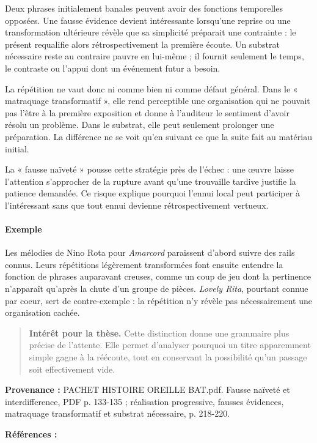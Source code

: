 \documentclass[10pt,a4paper]{article}
\begin{document}
Deux phrases initialement banales peuvent avoir des fonctions temporelles opposées. Une fausse évidence devient intéressante lorsqu'une reprise ou une transformation ultérieure révèle que sa simplicité préparait une contrainte : le présent requalifie alors rétrospectivement la première écoute. Un substrat nécessaire reste au contraire pauvre en lui-même ; il fournit seulement le temps, le contraste ou l'appui dont un événement futur a besoin.

La répétition ne vaut donc ni comme bien ni comme défaut général. Dans le « matraquage transformatif », elle rend perceptible une organisation qui ne pouvait pas l'être à la première exposition et donne à l'auditeur le sentiment d'avoir résolu un problème. Dans le substrat, elle peut seulement prolonger une préparation. La différence ne se voit qu'en suivant ce que la suite fait au matériau initial.

La « fausse naïveté » pousse cette stratégie près de l'échec : une œuvre laisse l'attention s'approcher de la rupture avant qu'une trouvaille tardive justifie la patience demandée. Ce risque explique pourquoi l'ennui local peut participer à l'intéressant sans que tout ennui devienne rétrospectivement vertueux.

\paragraph{Exemple}
Les mélodies de Nino Rota pour \emph{Amarcord} paraissent d'abord suivre des rails connus. Leurs répétitions légèrement transformées font ensuite entendre la fonction de phrases auparavant creuses, comme un coup de jeu dont la pertinence n'apparaît qu'après la chute d'un groupe de pièces. \emph{Lovely Rita}, pourtant connue par coeur, sert de contre-exemple : la répétition n'y révèle pas nécessairement une organisation cachée.

\begin{quote}
\textbf{Intérêt pour la thèse.} Cette distinction donne une grammaire plus précise de l'attente. Elle permet d'analyser pourquoi un titre apparemment simple gagne à la réécoute, tout en conservant la possibilité qu'un passage soit effectivement vide.
\end{quote}
{\footnotesize\color{metadata}\textbf{Provenance :} PACHET HISTOIRE OREILLE BAT.pdf. Fausse naïveté et interdifference, PDF p. 133-135 ; réalisation progressive, fausses évidences, matraquage transformatif et substrat nécessaire, p. 218-220.\par}
{\footnotesize\color{metadata}\textbf{Références :} \parencite{pachet2018oreille}\par}
\end{document}
